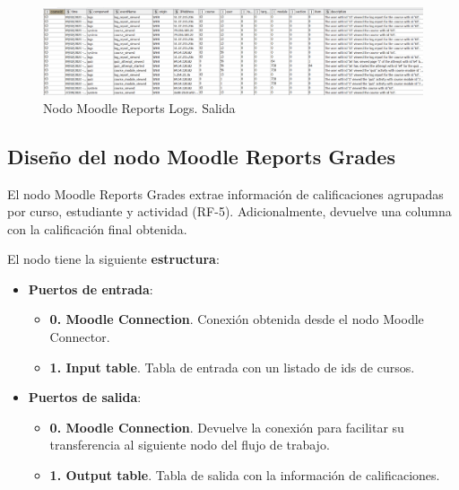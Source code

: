\begin{figure}[!h]
	\centering
	\includegraphics[width=1\textwidth]{img/nodes_moodle_reports_logs_output.png}
	\caption{Nodo Moodle Reports Logs. Salida}
	\label{fig:moodlereportslogs_output}
\end{figure}
\FloatBarrier
\hphantom{ }




\newpage
\subsection{Diseño del nodo Moodle Reports Grades}

El nodo Moodle Reports Grades extrae información de calificaciones agrupadas por curso, estudiante y actividad (RF-5). Adicionalmente, devuelve una columna con la calificación final obtenida. 
\

El nodo tiene la siguiente \textbf{estructura}:

\begin{itemize}
	\item \textbf{Puertos de entrada}: 
    \begin{itemize}
		\item \textbf{0. Moodle Connection}. Conexión obtenida desde el nodo Moodle Connector. 
		\item \textbf{1. Input table}. Tabla de entrada con un listado de ids de cursos. 
   	\end{itemize}

	\item \textbf{Puertos de salida}: 
    \begin{itemize}
		\item \textbf{0. Moodle Connection}. Devuelve la conexión para facilitar su transferencia al siguiente nodo del flujo de trabajo. 
		\item \textbf{1. Output table}. Tabla de salida con la información de calificaciones. 
   	\end{itemize}

\end{itemize}

